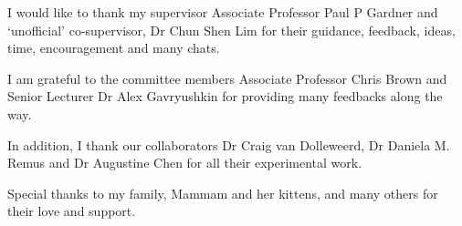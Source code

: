 \begin{acknowledgements}
I would like to thank my supervisor Associate Professor Paul P Gardner and `unofficial' co-supervisor, Dr Chun Shen Lim for their guidance, feedback, ideas, time, encouragement and many chats. 

I am grateful to the committee members Associate Professor Chris Brown and Senior Lecturer Dr Alex Gavryushkin for providing many feedbacks along the way. 

In addition, I thank our collaborators Dr Craig van Dolleweerd, Dr Daniela M. Remus and Dr Augustine Chen for all their experimental work.

Special thanks to my family, Mammam and her kittens, and many others for their love and support.

\end{acknowledgements}